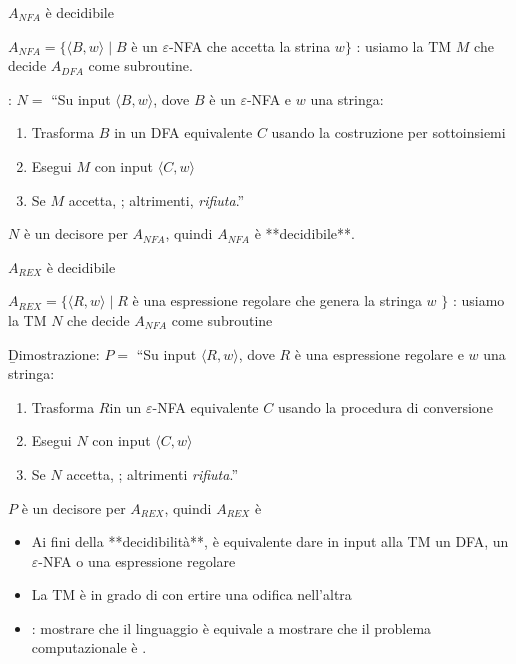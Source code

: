 \begin{theorem}{$A_{NFA}$ è decidibile}\end{theorem}
$A_{NFA} = \{\langle B,w\rangle\mid B$ è un $\varepsilon$-NFA che accetta la strina $w\}$ 
: usiamo la TM $M$ che decide $A_{DFA}$ come subroutine.

: 
$N=$ ``Su input $\langle B,w\rangle$, dove $B$ è un $\varepsilon$-NFA e $w$ una stringa: 
\begin{enumerate}
	\item Trasforma $B$ in un DFA equivalente $C$ usando la costruzione per sottoinsiemi
	\item Esegui $M$ con input $\langle C,w\rangle$ 
	\item  Se $M$ accetta, ; altrimenti, \textit{rifiuta}.''
\end{enumerate}
$N$ è un decisore per $A_{NFA}$, quindi $A_{NFA}$ è **decidibile**. 

\begin{theorem}$A_{REX}$ è decidibile\end{theorem}
$A_{REX} = \{\langle R, w\rangle\mid R$ è una espressione regolare che genera la stringa $w$ $\}$ 
: usiamo la TM $N$ che decide $A_{NFA}$ come subroutine

\b{Dimostrazione}:
$P=$ ``Su input $\langle R,w\rangle$, dove $R$ è una espressione regolare e $w$ una stringa: 
\begin{enumerate}
	\item Trasforma $R $in un $\varepsilon$-NFA equivalente $C$ usando la procedura di conversione
	\item  Esegui $N$ con input $\langle C,w\rangle$ 
	\item  Se $N$ accetta, ; altrimenti \textit{rifiuta}.''
\end{enumerate}
$P$ è un decisore per $A_{REX}$, quindi $A_{REX}$ è  

\begin{itemize}
	\item Ai fini della **decidibilità**, è equivalente dare in input alla TM un DFA, un $\varepsilon$-NFA o una espressione regolare
	\item La TM è in grado di con ertire una odifica nell'altra
	\item {}: mostrare che il linguaggio è  equivale a mostrare che il problema computazionale è .
\end{itemize}

